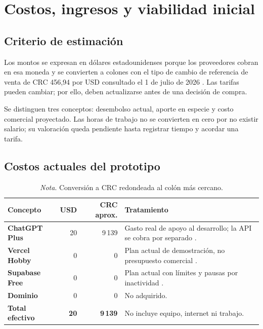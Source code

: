 \section{Costos, ingresos y viabilidad inicial}

\subsection{Criterio de estimación}

Los montos se expresan en dólares estadounidenses porque los proveedores cobran
en esa moneda y se convierten a colones con el tipo de cambio de referencia de
venta de CRC 456,94 por USD consultado el 1 de julio de 2026
\parencite{bccr_tipo_cambio}. Las tarifas pueden cambiar; por ello, deben
actualizarse antes de una decisión de compra.

Se distinguen tres conceptos: desembolso actual, aporte en especie y costo
comercial proyectado. Las horas de trabajo no se convierten en cero por no existir
salario; su valoración queda pendiente hasta registrar tiempo y acordar una tarifa.

\subsection{Costos actuales del prototipo}

\begin{table}[H]
\caption{Desembolso mensual actual del prototipo}
\begin{tabularx}{\textwidth}{>{\bfseries}p{3.2cm}r r X}
\toprule
Concepto & USD & CRC aprox. & Tratamiento \\
\midrule
ChatGPT Plus & 20 & 9\,139 & Gasto real de apoyo al desarrollo; la API se cobra por separado \parencite{openai_plus}. \\
Vercel Hobby & 0 & 0 & Plan actual de demostración, no presupuesto comercial \parencite{vercel_pricing}. \\
Supabase Free & 0 & 0 & Plan actual con límites y pausas por inactividad \parencite{supabase_pricing}. \\
Dominio & 0 & 0 & No adquirido. \\
\midrule
\textbf{Total efectivo} & \textbf{20} & \textbf{9\,139} & No incluye equipo, internet ni trabajo. \\
\bottomrule
\end{tabularx}
\caption*{\textit{Nota}. Conversión a CRC redondeada al colón más cercano.}
\end{table}

